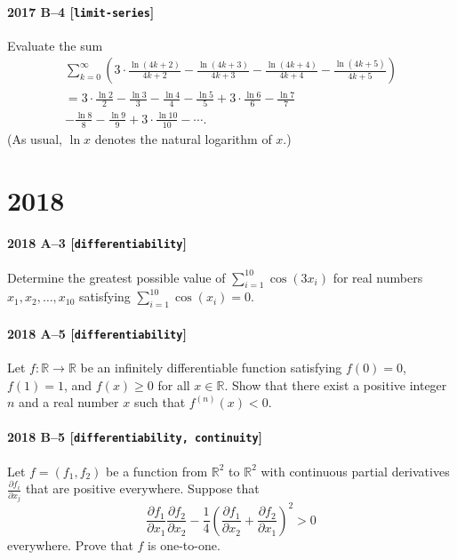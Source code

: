 \documentclass[11pt]{article}
\begin{document}
\paragraph{2017 B--4 \textnormal{[\texttt{limit-series}]}}
Evaluate the sum
\begin{gather*}
\sum_{k=0}^\infty \left( 3 \cdot \frac{\ln(4k+2)}{4k+2} - \frac{\ln(4k+3)}{4k+3} - \frac{\ln(4k+4)}{4k+4} - \frac{\ln(4k+5)}{4k+5} \right) \\
= 3 \cdot \frac{\ln 2}{2} - \frac{\ln 3}{3} - \frac{\ln 4}{4} - \frac{\ln 5}{5}
+ 3 \cdot \frac{\ln 6}{6} - \frac{\ln 7}{7} \\ - \frac{\ln 8}{8} - \frac{\ln 9}{9}
+ 3 \cdot \frac{\ln 10}{10} - \cdots .
\end{gather*}
(As usual, $\ln x$ denotes the natural logarithm of $x$.)

\section*{2018}

\paragraph{2018 A--3 \textnormal{[\texttt{differentiability}]}}
Determine the greatest possible value of $\sum_{i=1}^{10} \cos(3x_i)$ for real numbers $x_1,x_2,\dots,x_{10}$
satisfying $\sum_{i=1}^{10} \cos(x_i) = 0$.

\paragraph{2018 A--5 \textnormal{[\texttt{differentiability}]}}
Let $f: \mathbb{R} \to \mathbb{R}$ be an infinitely differentiable function satisfying $f(0) = 0$, $f(1)= 1$,
and $f(x) \geq 0$ for all $x \in \mathbb{R}$. Show that there exist a positive integer $n$ and a real number $x$
such that $f^{(n)}(x) < 0$.

\paragraph{2018 B--5 \textnormal{[\texttt{differentiability, continuity}]}}
Let $f = (f_1, f_2)$ be a function from $\mathbb{R}^2$ to $\mathbb{R}^2$ with continuous partial derivatives
$\frac{\partial f_i}{\partial x_j}$ that are positive everywhere. Suppose that
\[
\frac{\partial f_1}{\partial x_1} \frac{\partial f_2}{\partial x_2} - \frac{1}{4} \left( \frac{\partial f_1}{\partial x_2}  + \frac{\partial f_2}{\partial x_1} \right)^2 > 0
\]
everywhere. Prove that $f$ is one-to-one.
\end{document}
